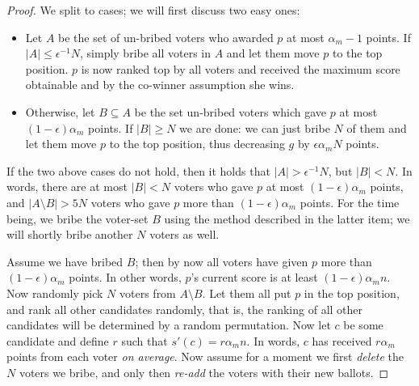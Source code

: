 \documentclass[letterpaper]{article} %
\newtheorem{lemma}[theorem]{Lemma}
\theoremstyle{definition}
\newcommand{\abs}[1]{\lvert #1 \rvert}
\newcommand{\NN}{\mathcal{N}}
\newcommand\vecgreek{\bm}
\newcommand{\veca}{\vecgreek{\alpha}}
\begin{document}
\begin{proof}	We split to cases; we will first discuss two easy ones:
	\begin{itemize}
		\item Let $A$ be the set of un-bribed voters who awarded $p$ at most $\alpha_m -1$ points. If $\abs{A} \leq \epsilon^{-1}N$, simply bribe all voters in $A$ and let them move $p$ to the top position. $p$ is now ranked top by all voters and received the maximum score obtainable and by the co-winner assumption she wins.

		\item Otherwise, let $B \subseteq A$ be the set un-bribed voters which gave $p$ at most $(1-\epsilon) \alpha_m$ points. If $\abs{B} \geq N$ we are done: we can just bribe $N$ of them and let them move $p$ to the top position, thus decreasing $g$ by $\epsilon \alpha_m N$ points.
	\end{itemize}
	If the two above cases do not hold, then it holds that $\abs{A} > \epsilon^{-1}N$, but $\abs{B} < N$. In words, there are at most $\abs{B} < N$ voters who gave $p$ at most $(1-\epsilon) \alpha_m$ points, and $\abs{A \setminus B} > 5N$ voters who gave $p$ more than $(1-\epsilon) \alpha_m$ points. For the time being, we bribe the voter-set $B$ using the method described in the latter item; we will shortly bribe another $N$ voters as well.

	Assume we have bribed $B$; then by now all voters have given $p$ more than $(1-\epsilon) \alpha_m$ points. In other words, $p$'s current score is at least $(1-\epsilon) \alpha_m n$.
	Now randomly pick $N$  voters from $A\setminus B$. Let them all put $p$ in the top position, and rank all other candidates randomly, that is, the ranking of all other candidates will be determined by a random permutation. Now let $c$ be some candidate and define $r$ such that $s'(c)=r \alpha_m n$. In words, $c$ has received $r\alpha_m$ points from each voter \emph{on average}. Now assume for a moment we first \emph{delete} the $N$ voters we bribe, and only then \emph{re-add} the voters with their new ballots.


\end{proof}
\end{document}
